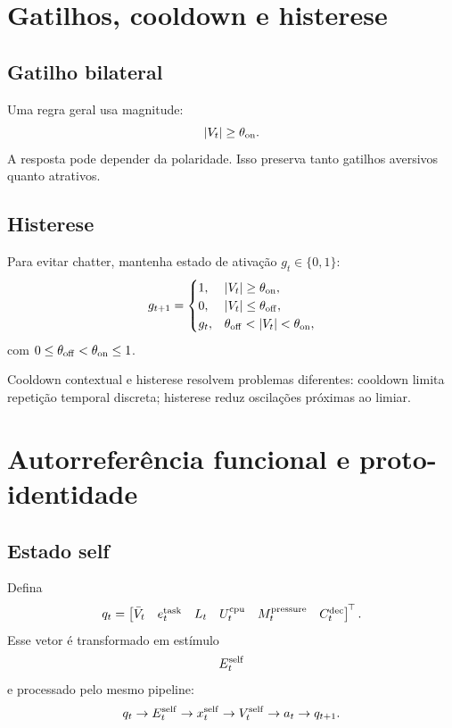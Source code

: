 \section{Gatilhos, cooldown e histerese}

\subsection{Gatilho bilateral}

Uma regra geral usa magnitude:
\begin{equation}
\left\lvert V_t \right\rvert\ge\theta_{\rm on}.
\end{equation}
A resposta pode depender da polaridade. Isso preserva tanto gatilhos aversivos quanto atrativos.

\subsection{Histerese}

Para evitar chatter, mantenha estado de ativação \(g_t\in\{0,1\}\):
\begin{equation}
g_{t+1}=
\begin{cases}
1, & \left\lvert V_t \right\rvert\ge\theta_{\rm on},\\
0, & \left\lvert V_t \right\rvert\le\theta_{\rm off},\\
g_t, & \theta_{\rm off}<\left\lvert V_t \right\rvert<\theta_{\rm on},
\end{cases}
\end{equation}
com \(0\le\theta_{\rm off}<\theta_{\rm on}\le1\).

Cooldown contextual e histerese resolvem problemas diferentes: cooldown limita repetição temporal discreta; histerese reduz oscilações próximas ao limiar.

\section{Autorreferência funcional e proto-identidade}

\subsection{Estado self}

Defina
\begin{equation}
q_t=
\begin{bmatrix}
\bar V_t &
e_t^{\rm task} &
L_t &
U_t^{\rm cpu} &
M_t^{\rm pressure} &
C_t^{\rm dec}
\end{bmatrix}^{\!\top}.
\end{equation}
Esse vetor é transformado em estímulo
\begin{equation}
E_t^{\rm self}
\end{equation}
e processado pelo mesmo pipeline:
\begin{equation}
q_t\rightarrow E_t^{\rm self}\rightarrow x_t^{\rm self}
\rightarrow V_t^{\rm self}\rightarrow a_t\rightarrow q_{t+1}.
\end{equation}

